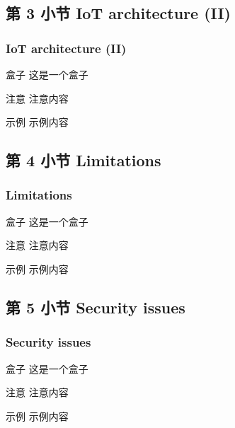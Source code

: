 \documentclass[
    aspectratio=169,                   %
]{beamer}
\begin{document}
\subsection{第 3 小节 IoT architecture (II)}

    \begin{frame}
        \frametitle{IoT architecture (II)}
        
        \begin{block}{盒子}
            这是一个盒子\cite{ouaddah}
        \end{block}

        \begin{alertblock}{注意}
            注意内容
        \end{alertblock}

        \begin{exampleblock}{示例}
            示例内容
        \end{exampleblock}
    \end{frame}

\subsection{第 4 小节 Limitations}

    \begin{frame}
        \frametitle{Limitations}
        
        \begin{block}{盒子}
            这是一个盒子\cite{novo}
        \end{block}

        \begin{alertblock}{注意}
            注意内容
        \end{alertblock}

        \begin{exampleblock}{示例}
            示例内容
        \end{exampleblock}
    \end{frame}

\subsection{第 5 小节 Security issues}

    \begin{frame}
        \frametitle{Security issues}
        
        \begin{block}{盒子}
            这是一个盒子\cite{novo}
        \end{block}

        \begin{alertblock}{注意}
            注意内容
        \end{alertblock}

        \begin{exampleblock}{示例}
            示例内容
        \end{exampleblock}
    \end{frame}
\end{document}
